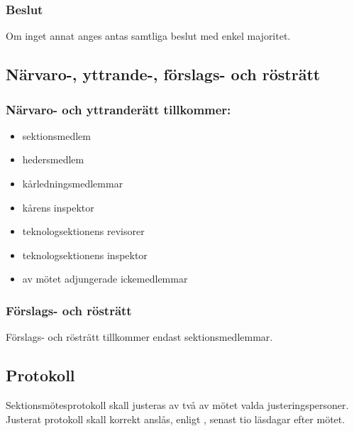 \subsubsection{Beslut}
Om inget annat anges antas samtliga beslut med enkel majoritet.

\subsection{Närvaro-, yttrande-, förslags- och rösträtt}

\subsubsection{Närvaro- och yttranderätt tillkommer:}
\begin{itemize}
	\item sektionsmedlem
	\item hedersmedlem
	\item kårledningsmedlemmar
	\item kårens inspektor
	\item teknologsektionens revisorer
	\item teknologsektionens inspektor
	\item av mötet adjungerade ickemedlemmar
\end{itemize}

\subsubsection{Förslags- och rösträtt}
Förslags- och rösträtt tillkommer endast sektionsmedlemmar.

\subsection{Protokoll}
Sektionsmötesprotokoll skall justeras av två av mötet valda justeringspersoner. Justerat protokoll skall korrekt anslås, enligt , senast tio läsdagar efter mötet.

